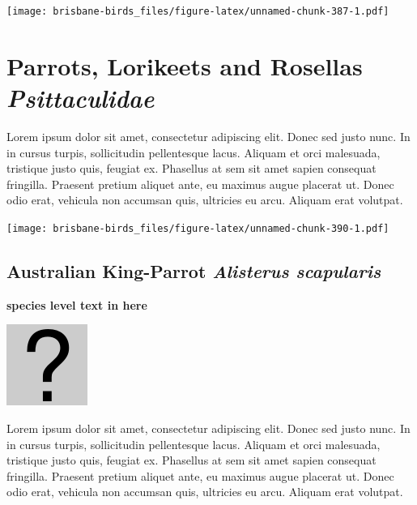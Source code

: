 \documentclass[]{book}
\let\origfigure\figure
\let\endorigfigure\endfigure
\renewenvironment{figure}[1][2] {
  \expandafter\origfigure\expandafter[H]
} {
  \endorigfigure
}
\begin{document}
\begin{figure}
\centering
\texttt{[image: brisbane-birds\_files/figure-latex/unnamed-chunk-387-1.pdf]}
\caption{\label{fig:unnamed-chunk-387}insert figure caption}
\end{figure}

\chapter{\texorpdfstring{Parrots, Lorikeets and Rosellas
\emph{Psittaculidae}}{Parrots, Lorikeets and Rosellas Psittaculidae}}\label{parrots-lorikeets-and-rosellas-psittaculidae}

Lorem ipsum dolor sit amet, consectetur adipiscing elit. Donec sed justo
nunc. In in cursus turpis, sollicitudin pellentesque lacus. Aliquam et
orci malesuada, tristique justo quis, feugiat ex. Phasellus at sem sit
amet sapien consequat fringilla. Praesent pretium aliquet ante, eu
maximus augue placerat ut. Donec odio erat, vehicula non accumsan quis,
ultricies eu arcu. Aliquam erat volutpat.

\texttt{[image: brisbane-birds\_files/figure-latex/unnamed-chunk-390-1.pdf]}

\section{\texorpdfstring{Australian King-Parrot \emph{Alisterus
scapularis}}{Australian King-Parrot Alisterus scapularis}}\label{australian-king-parrot-alisterus-scapularis}

\textbf{species level text in here}

\begin{figure}
\centering
\includegraphics{assets/missing.png}
\caption{No image for species}
\end{figure}

Lorem ipsum dolor sit amet, consectetur adipiscing elit. Donec sed justo
nunc. In in cursus turpis, sollicitudin pellentesque lacus. Aliquam et
orci malesuada, tristique justo quis, feugiat ex. Phasellus at sem sit
amet sapien consequat fringilla. Praesent pretium aliquet ante, eu
maximus augue placerat ut. Donec odio erat, vehicula non accumsan quis,
ultricies eu arcu. Aliquam erat volutpat.
\end{document}
